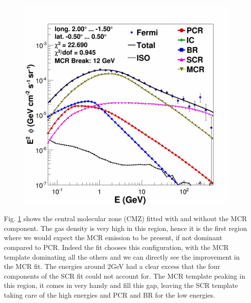 \begin{figure}[h]
\begin{minipage}[h]{0.45\textwidth}
	  \includegraphics[width=\linewidth]{pic/results/MCRonly_CMZ.png}
  	  \label{fig:MCRonly_CMZ}
  \end{minipage}
  \label{fig:MCR_vs_SCRonly_CMZ}
\end{figure}

Fig. \ref{fig:MCR_vs_SCRonly_CMZ} shows the central molecular zone (CMZ) fitted with and without the MCR component. The gas density is very high in this region, hence it is the first region where we would expect the MCR emission to be present, if not dominant compared to PCR. Indeed the fit chooses this configuration, with the MCR template dominating all the others and we can directly see the improvement in the MCR fit. The energies around 2GeV had a clear excess that the four components of the SCR fit could not account for. The MCR template peaking in this region, it comes in very handy and fill this gap, leaving the SCR template taking care of the high energies and PCR and BR for the low energies. 



